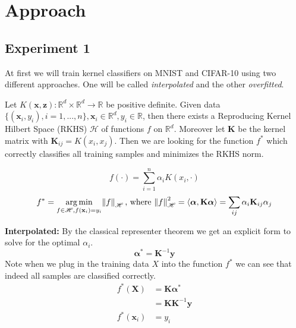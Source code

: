 \section{Approach}

\subsection{Experiment 1}

At first we will train kernel classifiers on MNIST and CIFAR-10 using two different approaches. One will be called \textit{interpolated} and the other \textit{overfitted}.

Let $K(\mathbf{x}, \mathbf{z}) : \mathbb{R}^d \times \mathbb{R}^d \rightarrow \mathbb{R}$ be positive definite. Given data $\{(\mathbf{x}_i, y_i), i=1,...,n\}, \mathbf{x}_i \in \mathbb{R}^d, y_i \in \mathbb{R}$, then there exists a Reproducing Kernel Hilbert Space (RKHS) $\mathscr{H}$ of functions $f$ on $\mathbb{R}^d$. Moreover let $\mathbf{K}$ be the kernel matrix with $\mathbf{K}_{ij} = K(x_i, x_j)$. Then we are looking for the function $f^*$ which correctly classifies all training samples and minimizes the RKHS norm.

\begin{equation}
    f(\cdot) = \sum_{i=1}^{n} \alpha_{i} K(x_{i} ,\cdot)
\end{equation}
\begin{equation}
    f^* = \operatorname*{arg\,min}_{f \in \mathscr{H}, f(\mathbf{x}_i)=y_i} \norm{f}_\mathscr{H} \text{, where } \norm{f}_\mathscr{H}^2 = \langle \boldsymbol{\alpha}, \mathbf{K} \boldsymbol{\alpha} \rangle = \sum_{ij} \alpha_i \mathbf{K}_{ij} \alpha_j
\end{equation}




\textbf{Interpolated:} By the classical representer theorem we get an explicit form to solve for the optimal $\alpha_i$.
\begin{equation}
    \boldsymbol{\alpha^*} =  \mathbf{K}^{-1} \mathbf{y}
\end{equation}
Note when we plug in the training data $X$ into the function $f^*$ we can see that indeed all samples are classified correctly.
\begin{equation}
\begin{aligned}
    f^*(\mathbf{X}) &= \mathbf{K} \boldsymbol{\alpha^*} \\
    &= \mathbf{K} \mathbf{K}^{-1} \mathbf{y} \\
    f^*(\mathbf{x}_i) &= y_i \\
\end{aligned}
\end{equation}


